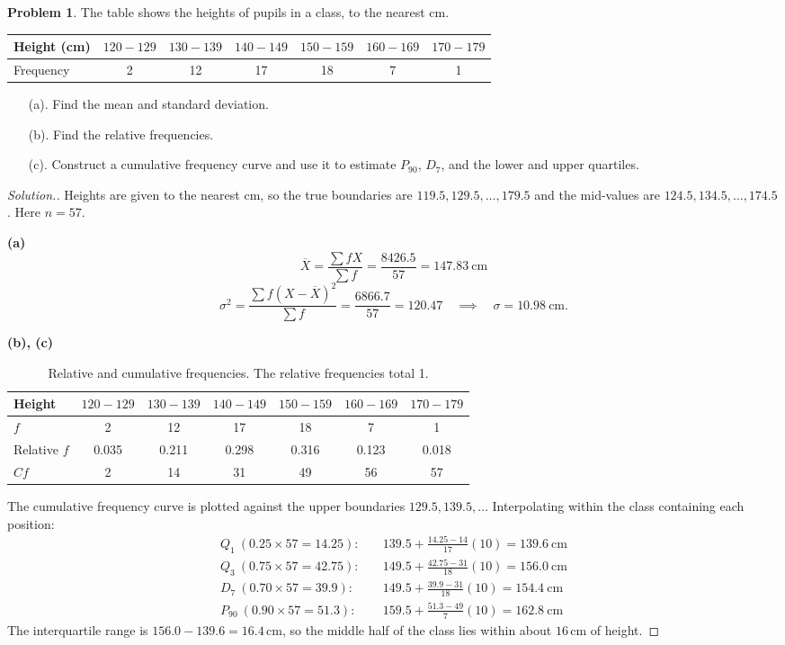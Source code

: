 \documentclass[11pt,a4paper]{article}
\theoremstyle{definition}
\newtheorem{problemx}{Problem}[section]
\newenvironment{problem}{\begin{problemx}}{\end{problemx}}
\newenvironment{solution}
  {\renewcommand{\qedsymbol}{}\begin{proof}[\textit{Solution}.]}
  {\end{proof}}
\begin{document}
\begin{problem}
The table shows the heights of pupils in a class, to the nearest cm.
\begin{table}[H]
\centering
\begin{tabular}{|l|c|c|c|c|c|c|}
\hline
Height (cm) & $120-129$ & $130-139$ & $140-149$ & $150-159$ & $160-169$ & $170-179$\\
\hline
Frequency & 2 & 12 & 17 & 18 & 7 & 1\\
\hline
\end{tabular}
\end{table}
\begin{enumerate}
\item[(a).] Find the mean and standard deviation.
\item[(b).] Find the relative frequencies.
\item[(c).] Construct a cumulative frequency curve and use it to estimate $P_{90}$, $D_7$,
and the lower and upper quartiles.
\end{enumerate}
\end{problem}

\begin{solution}
Heights are given to the nearest cm, so the true boundaries are $119.5, 129.5, \ldots, 179.5$
and the mid-values are $124.5, 134.5, \ldots, 174.5$. Here $n=57$.

\textbf{(a)}
\[\overline{X}=\frac{\sum fX}{\sum f}=\frac{8426.5}{57}=147.83\ \text{cm}\]
\[\sigma^2=\frac{\sum f(X-\overline{X})^2}{\sum f}=\frac{6866.7}{57}=120.47
\quad\implies\quad \sigma=10.98\ \text{cm}.\]

\textbf{(b), (c)}
\begin{table}[H]
\centering
\begin{tabular}{|l|c|c|c|c|c|c|}
\hline
Height & $120-129$ & $130-139$ & $140-149$ & $150-159$ & $160-169$ & $170-179$\\
\hline
$f$ & 2 & 12 & 17 & 18 & 7 & 1\\
Relative $f$ & 0.035 & 0.211 & 0.298 & 0.316 & 0.123 & 0.018\\
$Cf$ & 2 & 14 & 31 & 49 & 56 & 57\\
\hline
\end{tabular}
\caption{Relative and cumulative frequencies. The relative frequencies total 1.}
\end{table}
The cumulative frequency curve is plotted against the upper boundaries $129.5, 139.5, \ldots$
Interpolating within the class containing each position:
\begin{align*}
Q_1\ (0.25\times 57=14.25):&\quad 139.5+\frac{14.25-14}{17}(10)=139.6\ \text{cm}\\
Q_3\ (0.75\times 57=42.75):&\quad 149.5+\frac{42.75-31}{18}(10)=156.0\ \text{cm}\\
D_7\ (0.70\times 57=39.9):&\quad 149.5+\frac{39.9-31}{18}(10)=154.4\ \text{cm}\\
P_{90}\ (0.90\times 57=51.3):&\quad 159.5+\frac{51.3-49}{7}(10)=162.8\ \text{cm}
\end{align*}
The interquartile range is $156.0-139.6=16.4$\,cm, so the middle half of the class lies
within about $16$\,cm of height.
\end{solution}
\end{document}
